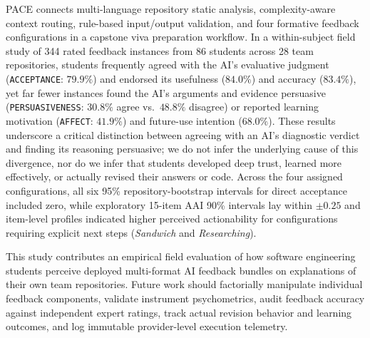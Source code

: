 \documentclass{llncs}
\begin{document}
PACE connects multi-language repository static analysis, complexity-aware context routing, rule-based input/output validation, and four formative feedback configurations in a capstone viva preparation workflow. In a within-subject field study of 344 rated feedback instances from 86 students across 28 team repositories, students frequently agreed with the AI's evaluative judgment (\texttt{ACCEPTANCE}: $79.9\%$) and endorsed its usefulness ($84.0\%$) and accuracy ($83.4\%$), yet far fewer instances found the AI's arguments and evidence persuasive (\texttt{PERSUASIVENESS}: $30.8\%$ agree vs.\ $48.8\%$ disagree) or reported learning motivation (\texttt{AFFECT}: $41.9\%$) and future-use intention ($68.0\%$). These results underscore a critical distinction between agreeing with an AI's diagnostic verdict and finding its reasoning persuasive; we do not infer the underlying cause of this divergence, nor do we infer that students developed deep trust, learned more effectively, or actually revised their answers or code. Across the four assigned configurations, all six 95\% repository-bootstrap intervals for direct acceptance included zero, while exploratory 15-item AAI 90\% intervals lay within $\pm 0.25$ and item-level profiles indicated higher perceived actionability for configurations requiring explicit next steps (\textit{Sandwich} and \textit{Researching}).

This study contributes an empirical field evaluation of how software engineering students perceive deployed multi-format AI feedback bundles on explanations of their own team repositories. Future work should factorially manipulate individual feedback components, validate instrument psychometrics, audit feedback accuracy against independent expert ratings, track actual revision behavior and learning outcomes, and log immutable provider-level execution telemetry.
\end{document}
